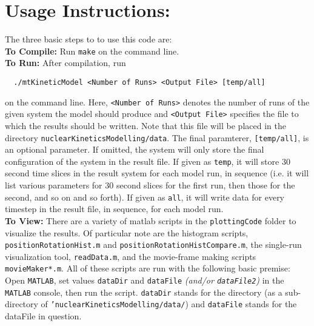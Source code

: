 \documentclass{article}
\begin{document}
\section{Usage Instructions:}
  The three basic steps to to use this code are:\\
  \textbf{To Compile:} Run \texttt{make} on the command line.\\
  \textbf{To Run:} After compilation, run
  \begin{verbatim}
  ./mtKineticModel <Number of Runs> <Output File> [temp/all]
  \end{verbatim}
  on the command line. Here, \texttt{<Number of Runs>} denotes the number of
  runs of the given system the model should produce and \texttt{<Output File>}
  specifies the file to which the results should be written. Note that this file
  will be placed in the directory \texttt{nuclearKineticsModelling/data}. The
  final paramterer, \texttt{[temp/all]}, is an optional parameter. If omitted,
  the system will only store the final configuration of the system in the result
  file. If given as \texttt{temp}, it will store 30 second time slices in the
  result system for each model run, in sequence (i.e. it will list various
  parameters for 30 second slices for the first run, then those for the second,
  and so on and so forth). If given as \texttt{all}, it will write data for
  every timestep in the result file, in sequence, for each model run. \\
  \textbf{To View: } There are a variety of matlab scripts in the
  \texttt{plottingCode} folder to visualize the results. Of particular note are
  the histogram scripts, \texttt{positionRotationHist.m} and
  \texttt{positionRotationHistCompare.m}, the single-run visualization tool,
  \texttt{readData.m}, and the movie-frame making scripts
  \texttt{movieMaker*.m}. All of these scripts are run with the following basic
  premise: Open \texttt{MATLAB}, set values \texttt{dataDir} and
  \texttt{dataFile} \textit{(and/or \texttt{dataFile2})} in the \texttt{MATLAB}
  console, then run the script. \texttt{dataDir} stands for the directory (as a
  sub-directory of \texttt{'nuclearKineticsModelling/data/}) and
  \texttt{dataFile} stands for the dataFile in question. 
\end{document}
